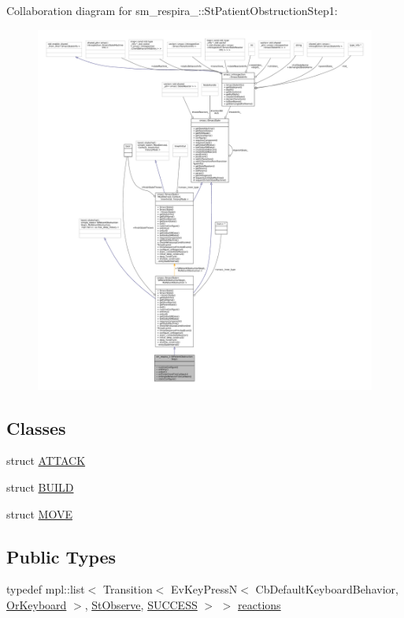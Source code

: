 Collaboration diagram for sm\+\_\+respira\+\_\+:\+:St\+Patient\+Obstruction\+Step1\+:
\nopagebreak
\begin{figure}[H]
\begin{center}
\leavevmode
\includegraphics[width=350pt]{structsm__respira__1_1_1StPatientObstructionStep1__coll__graph}
\end{center}
\end{figure}
\subsection*{Classes}
\begin{DoxyCompactItemize}
\item 
struct \hyperlink{structsm__respira__1_1_1StPatientObstructionStep1_1_1ATTACK}{A\+T\+T\+A\+CK}
\item 
struct \hyperlink{structsm__respira__1_1_1StPatientObstructionStep1_1_1BUILD}{B\+U\+I\+LD}
\item 
struct \hyperlink{structsm__respira__1_1_1StPatientObstructionStep1_1_1MOVE}{M\+O\+VE}
\end{DoxyCompactItemize}
\subsection*{Public Types}
\begin{DoxyCompactItemize}
\item 
typedef mpl\+::list$<$ Transition$<$ Ev\+Key\+PressN$<$ Cb\+Default\+Keyboard\+Behavior, \hyperlink{classsm__respira__1_1_1OrKeyboard}{Or\+Keyboard} $>$, \hyperlink{structsm__respira__1_1_1StObserve}{St\+Observe}, \hyperlink{classSUCCESS}{S\+U\+C\+C\+E\+SS} $>$ $>$ \hyperlink{structsm__respira__1_1_1StPatientObstructionStep1_a3dbf13d6ef34e327ff7fd96006be763e}{reactions}
\end{DoxyCompactItemize}
